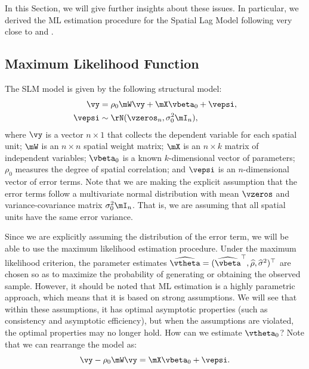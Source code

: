 In this Section, we will give further insights about these issues. In particular, we derived the ML estimation procedure for the Spatial Lag Model following very close to \cite{ord1975estimation} and \citet[][chapter 6]{anselin1988spatial}.

\subsection{Maximum Likelihood Function}

The SLM model is given by the following structural model:
\begin{equation}
  \begin{aligned}
    \vy     & = \rho_0 \mW\vy + \mX\vbeta_0 + \vepsi, \\
     \vepsi & \sim \rN(\vzeros_n , \sigma^2_0\mI_n),
  \end{aligned}
\end{equation}
%
where $\vy$ is a vector $n\times 1$ that collects the dependent variable for each spatial unit; $\mW$ is an $n\times n$ spatial weight matrix; $\mX$ is an $n \times k$ matrix of independent variables; $\vbeta_0$ is a known $k$-dimensional vector of parameters; $\rho_0$ measures the degree of spatial correlation; and $\vepsi$ is an $n$-dimensional vector of error terms. Note that we are making the explicit assumption that the error terms follow a multivariate normal distribution with mean $\vzeros$ and variance-covariance matrix $\sigma^2_0\mI_n$. That is, we are assuming that all spatial units have the same error variance. 

Since we are explicitly assuming the distribution of the error term, we will be able to use the maximum likelihood estimation procedure. Under the maximum likelihood criterion, the parameter estimates $\widehat{\vtheta} = (\widehat{\vbeta}^\top, \widehat{\rho}, \widehat{\sigma}^2)^\top$ are chosen so as to maximize the probability of generating or obtaining the observed sample.  However, it should be noted that ML estimation is a highly parametric approach, which means that it is based on strong assumptions. We will see that within these assumptions, it has optimal asymptotic properties (such as consistency and asymptotic efficiency), but when the assumptions are violated, the optimal properties may no longer hold. 
How can we estimate $\vtheta_0$? Note that we can rearrange the model as:
\begin{equation*}
\vy - \rho_0\mW\vy = \mX\vbeta_0 + \vepsi.
\end{equation*}

